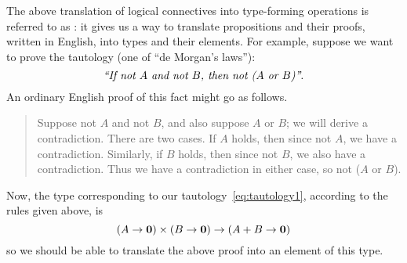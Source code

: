The above translation of logical connectives into type-forming operations is referred to as : it gives us a way to translate propositions and their proofs, written in English, into types and their elements.
For example, suppose we want to prove the tautology (one of ``de Morgan's laws''):
%
%
\begin{equation}\label{eq:tautology1}
  \text{\emph{``If not $A$ and not $B$, then not ($A$ or $B$)''}.}
\end{equation}
An ordinary English proof of this fact might go as follows.
\begin{quote}
  Suppose not $A$ and not $B$, and also suppose $A$ or $B$; we will derive a contradiction.
  There are two cases.
  If $A$ holds, then since not $A$, we have a contradiction.
  Similarly, if $B$ holds, then since not $B$, we also have a contradiction.
  Thus we have a contradiction in either case, so not ($A$ or $B$).
\end{quote}
Now, the type corresponding to our tautology~\eqref{eq:tautology1}, according to the rules given above, is
\begin{equation}\label{eq:tautology2}
  (A\to \emptyt) \times (B\to\emptyt) \to (A+B\to\emptyt)
\end{equation}
so we should be able to translate the above proof into an element of this type.


